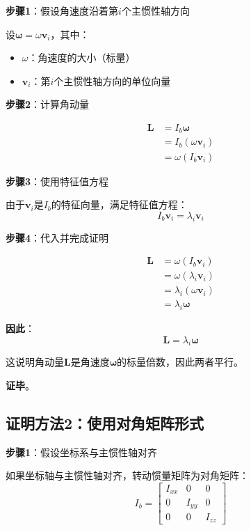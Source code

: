 \documentclass[12pt,a4paper]{article}
\begin{document}
\textbf{步骤1}：假设角速度沿着第$i$个主惯性轴方向

设$\bm{\omega} = \omega \bm{v}_i$，其中：
\begin{itemize}
\item $\omega$：角速度的大小（标量）
\item $\bm{v}_i$：第$i$个主惯性轴方向的单位向量
\end{itemize}

\textbf{步骤2}：计算角动量

\begin{align}
\bm{L} &= I_b \bm{\omega} \\
&= I_b (\omega \bm{v}_i) \\
&= \omega (I_b \bm{v}_i)
\end{align}

\textbf{步骤3}：使用特征值方程

由于$\bm{v}_i$是$I_b$的特征向量，满足特征值方程：
\begin{equation}
I_b \bm{v}_i = \lambda_i \bm{v}_i
\end{equation}

\textbf{步骤4}：代入并完成证明

\begin{align}
\bm{L} &= \omega (I_b \bm{v}_i) \\
&= \omega (\lambda_i \bm{v}_i) \\
&= \lambda_i (\omega \bm{v}_i) \\
&= \lambda_i \bm{\omega}
\end{align}

\textbf{因此}：
\begin{equation}
\bm{L} = \lambda_i \bm{\omega}
\end{equation}

这说明角动量$\bm{L}$是角速度$\bm{\omega}$的标量倍数，因此两者平行。

\textbf{证毕}。

\subsection{证明方法2：使用对角矩阵形式}

\textbf{步骤1}：假设坐标系与主惯性轴对齐

如果坐标轴与主惯性轴对齐，转动惯量矩阵为对角矩阵：
\begin{equation}
I_b = \begin{bmatrix}
I_{xx} & 0 & 0 \\
0 & I_{yy} & 0 \\
0 & 0 & I_{zz}
\end{bmatrix}
\end{equation}
\end{document}
